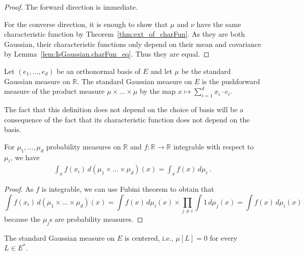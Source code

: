 \begin{proof}\leanok
The forward direction is immediate.

For the converse direction, it is enough to show that $\mu$ and $\nu$ have the same characteristic function by Theorem~\ref{thm:ext_of_charFun}. As they are both Gaussian, their characteristic functions only depend on their mean and covariance by Lemma~\ref{lem:IsGaussian.charFun_eq}. Thus they are equal.
\end{proof}


\begin{definition}\label{def:stdGaussian}
  \leanok
Let $(e_1, \ldots, e_d)$ be an orthonormal basis of $E$ and let $\mu$ be the standard Gaussian measure on $\mathbb{R}$.
The standard Gaussian measure on $E$ is the pushforward measure of the product measure $\mu \times \ldots \times \mu$ by the map $x \mapsto \sum_{i=1}^d x_i \cdot e_i$.
\end{definition}

The fact that this definition does not depend on the choice of basis will be a consequence of the fact that its characteristic function does not depend on the basis.


\begin{lemma}\label{lem:integral_eval_pi}
  \mathlibok
For $\mu_1, \ldots, \mu_d$ probability measures on $\mathbb{R}$ and $f : \mathbb{R} \to \mathbb{R}$ integrable with respect to $\mu_i$, we have
\begin{align*}
  \int_x f(x_i) \, d(\mu_1 \times \ldots \times \mu_d)(x)
  = \int_x f(x) \, d\mu_i
  \: .
\end{align*}
\end{lemma}

\begin{proof}\leanok
As $f$ is integrable, we can use Fubini theorem to obtain that
$$\int f(x_i) \, d(\mu_1 \times \ldots \times \mu_d)(x) = \int f(x) \, d\mu_i(x) \times \prod_{j \ne i} \int 1 \, d\mu_j(x) = \int f(x) \, d\mu_i(x)$$
because the $\mu_j$s are probability measures.
\end{proof}


\begin{lemma}\label{lem:isCentered_stdGaussian}
  \leanok
The standard Gaussian measure on $E$ is centered, i.e., $\mu[L] = 0$ for every $L \in E^*$.
\end{lemma}

